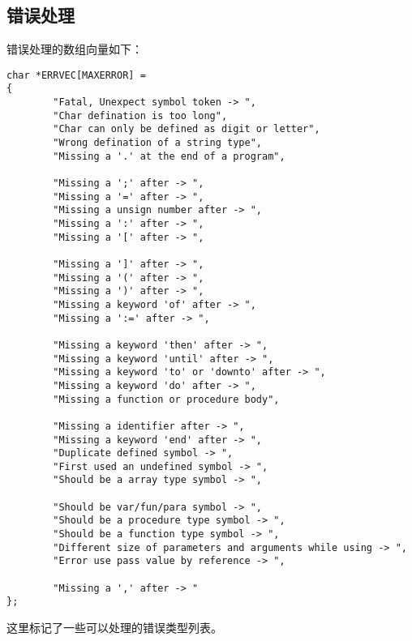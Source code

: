 \subsection{错误处理}
错误处理的数组向量如下：
\begin{verbatim}
char *ERRVEC[MAXERROR] = 
{
        "Fatal, Unexpect symbol token -> ",
        "Char defination is too long",
        "Char can only be defined as digit or letter",
        "Wrong defination of a string type",
        "Missing a '.' at the end of a program",

        "Missing a ';' after -> ",
        "Missing a '=' after -> ",
        "Missing a unsign number after -> ",
        "Missing a ':' after -> ",
        "Missing a '[' after -> ",

        "Missing a ']' after -> ",
        "Missing a '(' after -> ",
        "Missing a ')' after -> ",
        "Missing a keyword 'of' after -> ",
        "Missing a ':=' after -> ",

        "Missing a keyword 'then' after -> ",
        "Missing a keyword 'until' after -> ",
        "Missing a keyword 'to' or 'downto' after -> ",
        "Missing a keyword 'do' after -> ",
        "Missing a function or procedure body",
        
        "Missing a identifier after -> ",
        "Missing a keyword 'end' after -> ",
        "Duplicate defined symbol -> ",
        "First used an undefined symbol -> ",
        "Should be a array type symbol -> ",

        "Should be var/fun/para symbol -> ",
        "Should be a procedure type symbol -> ",
        "Should be a function type symbol -> ",
        "Different size of parameters and arguments while using -> ",
        "Error use pass value by reference -> ",

        "Missing a ',' after -> "
};
\end{verbatim}
这里标记了一些可以处理的错误类型列表。

